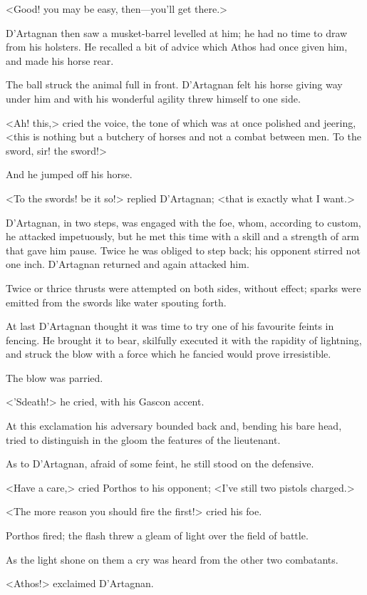 <Good! you may be easy, then—you'll get there.>

D'Artagnan then saw a musket-barrel levelled at him; he had no time to draw from his holsters. He recalled a bit of advice which Athos had once given him, and made his horse rear.

The ball struck the animal full in front. D'Artagnan felt his horse giving way under him and with his wonderful agility threw himself to one side.

<Ah! this,> cried the voice, the tone of which was at once polished and jeering, <this is nothing but a butchery of horses and not a combat between men. To the sword, sir! the sword!>

And he jumped off his horse.

<To the swords! be it so!> replied D'Artagnan; <that is exactly what I want.>

D'Artagnan, in two steps, was engaged with the foe, whom, according to custom, he attacked impetuously, but he met this time with a skill and a strength of arm that gave him pause. Twice he was obliged to step back; his opponent stirred not one inch. D'Artagnan returned and again attacked him.

Twice or thrice thrusts were attempted on both sides, without effect; sparks were emitted from the swords like water spouting forth.

At last D'Artagnan thought it was time to try one of his favourite feints in fencing. He brought it to bear, skilfully executed it with the rapidity of lightning, and struck the blow with a force which he fancied would prove irresistible.

The blow was parried.

<'Sdeath!> he cried, with his Gascon accent.

At this exclamation his adversary bounded back and, bending his bare head, tried to distinguish in the gloom the features of the lieutenant.

As to D'Artagnan, afraid of some feint, he still stood on the defensive.

<Have a care,> cried Porthos to his opponent; <I've still two pistols charged.>

<The more reason you should fire the first!> cried his foe.

Porthos fired; the flash threw a gleam of light over the field of battle.

As the light shone on them a cry was heard from the other two combatants.

<Athos!> exclaimed D'Artagnan.

